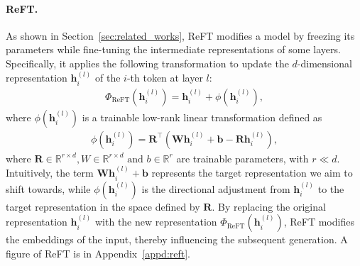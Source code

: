 


\paragraph{ReFT.} As shown in Section~\ref{sec:related_works}, ReFT modifies a model by freezing its parameters while fine-tuning the intermediate representations of some layers. {Specifically, it applies the following transformation to update the $d$-dimensional representation $\boldsymbol{h}_i^{(l)}$ of the $i$-th token at layer $l$:}
\begin{align*}
    \Phi_{\text{ReFT}}(\boldsymbol{h}_i^{(l)})=\boldsymbol{h}_i^{(l)}+ \phi(\boldsymbol{h}_i^{(l)}),
\end{align*}
where $\phi(\boldsymbol{h}_i^{(l)})$ is a trainable low-rank linear transformation defined as 
\begin{align}
    \phi(\boldsymbol{h}_i^{(l)})=\mathbf{R}^{\top}(\mathbf{W} \boldsymbol{h}_i^{(l)}+\boldsymbol{b}-\mathbf{R} \boldsymbol{h}_i^{(l)}),
    \label{eq:transform}
\end{align}
where $\mathbf{R} \in \mathbb{R}^{r \times d}, W \in \mathbb{R}^{r \times d} \text{~and~} b\in \mathbb{R}^{r}$ are trainable parameters, with $r \ll d$. Intuitively, the term $\mathbf{W} \boldsymbol{h}_i^{(l)}+\boldsymbol{b}$ represents the target representation we aim to shift towards, while  $\phi(\boldsymbol{h}_i^{(l)})$ is the directional adjustment from $\boldsymbol{h}_i^{(l)}$ to the target representation in the space defined by $\mathbf{R}$. By replacing the original representation $\boldsymbol{h}_i^{(l)}$ with the new representation $\Phi_{\text{ReFT}}(\boldsymbol{h}_i^{(l)})$, ReFT modifies the embeddings of the input, thereby influencing the subsequent generation. 
A figure of ReFT is in Appendix~\ref{appd:reft}.



